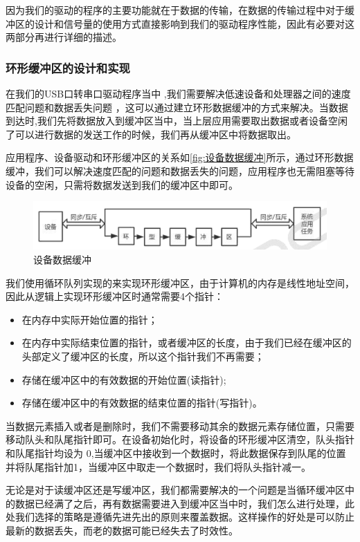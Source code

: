 	
	因为我们的驱动的程序的主要功能就在于数据的传输，在数据的传输过程中对于缓冲区的设计和信号量的使用方式直接影响到我们的驱动程序性能，因此有必要对这两部分再进行详细的描述。


\subsubsection{环形缓冲区的设计和实现}

	在我们的USB口转串口驱动程序当中 ,我们需要解决低速设备和处理器之间的速度匹配问题和数据丢失问题 ，这可以通过建立环形数据缓冲的方式来解决。当数据到达时,我们先将数据放入到缓冲区当中，当上层应用需要取出数据或者设备空闲了可以进行数据的发送工作的时候，我们再从缓冲区中将数据取出。
		
  应用程序、设备驱动和环形缓冲区的关系如\autoref{fig:设备数据缓冲}所示，通过环形数据缓冲，我们可以解决速度匹配的问题和数据丢失的问题，应用程序也无需阻塞等待设备的空闲，只需将数据发送到我们的缓冲区中即可。
  
\begin{figure}[!h]
\centering
\includegraphics[width=.9\textwidth]{./graphics/Dev-Data-Buf.pdf}
\caption{设备数据缓冲}\label{fig:设备数据缓冲}
\end{figure}

	 
	我们使用循环队列实现的来实现环形缓冲区，由于计算机的内存是线性地址空间，因此从逻辑上实现环形缓冲区时通常需要4个指针：
	 \begin{itemize}
	 \item 在内存中实际开始位置的指针；
	 \item 在内存中实际结束位置的指针，或者缓冲区的长度，由于我们已经在缓冲区的头部定义了缓冲区的长度，所以这个指针我们不再需要；
	 \item 存储在缓冲区中的有效数据的开始位置(读指针);
	 \item 存储在缓冲区中的有效数据的结束位置的指针(写指针)。
	 \end{itemize}
	
当数据元素插入或者是删除时，我们不需要移动其余的数据元素存储位置，只需要移动队头和队尾指针即可。在设备初始化时，将设备的环形缓冲区清空，队头指针和队尾指针均设为 0,当缓冲区中接收到一个数据时，将此数据保存到队尾的位置并将队尾指针加1，当缓冲区中取走一个数据时，我们将队头指针减一。

	无论是对于读缓冲区还是写缓冲区，我们都需要解决的一个问题是当循环缓冲区中的数据已经满了之后，再有数据需要进入到缓冲区当中时，我们怎么进行处理，此处我们选择的策略是遵循先进先出的原则来覆盖数据。这样操作的好处是可以防止最新的数据丢失，而老的数据可能已经失去了时效性。

